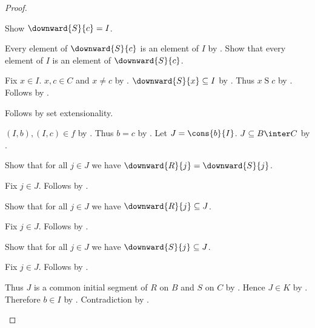 \begin{proof}
\begin{subproof}
        Show $\downward{S}{c}=I$.
        \begin{subproof}
            Every element of $\downward{S}{c}$ is an element of $I$
                by .
            Show that every element of $I$ is an element of $\downward{S}{c}$.
            \begin{subproof}
                Fix $x\in I$.
                $x,c\in C$ and $x\neq c$ by .
                $\downward{S}{x}\subseteq I$ by .
                Thus $x\mathrel{S}c$ by .
                Follows by .
            \end{subproof}
            Follows by set extensionality.
        \end{subproof}

        $(I,b),(I,c)\in f$ by
            .
        Thus $b=c$ by .
        Let $J=\cons{b}{I}$.
        $J\subseteq B\inter C$ by .

        Show that for all $j\in J$ we have $\downward{R}{j}=\downward{S}{j}$.
        \begin{subproof}
            Fix $j\in J$.
            Follows by .
        \end{subproof}

        Show that for all $j\in J$ we have $\downward{R}{j}\subseteq J$.
        \begin{subproof}
            Fix $j\in J$.
            Follows by .
        \end{subproof}

        Show that for all $j\in J$ we have $\downward{S}{j}\subseteq J$.
        \begin{subproof}
            Fix $j\in J$.
            Follows by .
        \end{subproof}

        Thus $J$ is a common initial segment of $R$ on $B$ and $S$ on $C$
            by .
        Hence $J\in K$ by .
        Therefore $b\in I$ by .
        Contradiction by .
    \end{subproof}


\end{proof}
